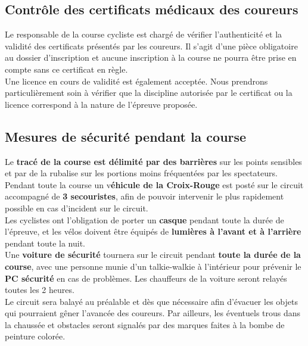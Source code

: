\documentclass[hidelinks, paper=a4, fontsize=13pt]{report}
\begin{document}
\subsection{Contrôle des certificats médicaux des coureurs}

Le responsable de la course cycliste est chargé de vérifier l’authenticité et la validité des certificats présentés par les coureurs. Il s’agit d’une pièce obligatoire au dossier d’inscription et aucune inscription à la course ne pourra être prise en compte sans ce certificat en règle.\\
Une licence en cours de validité est également acceptée.
Nous prendrons particulièrement soin à vérifier que la discipline autorisée par le certificat ou la licence correspond à la nature de l’épreuve proposée.

\subsection{Mesures de sécurité pendant la course}

Le \textbf{tracé de la course est délimité par des barrières} sur les points sensibles et par de la rubalise sur les portions moins fréquentées par les spectateurs.\\

Pendant toute la course un v\textbf{éhicule de la Croix-Rouge} est posté sur le circuit accompagné de \textbf{3 secouristes}, afin de pouvoir intervenir le plus rapidement possible en cas d’incident sur le circuit. \\

Les cyclistes ont l’obligation de porter un \textbf{casque} pendant toute la durée de l’épreuve, et les vélos doivent être équipés de \textbf{lumières à l’avant et à l’arrière} pendant toute la nuit.\\

Une \textbf{voiture de sécurité} tournera sur le circuit pendant \textbf{toute la durée de la course}, avec une personne munie d’un talkie-walkie à l’intérieur pour prévenir le \textbf{PC sécurité} en cas de problèmes. Les chauffeurs de la voiture seront relayés toutes les 2 heures.\\

Le circuit sera balayé au préalable et dès que nécessaire afin d’évacuer les objets qui pourraient gêner l’avancée des coureurs. Par ailleurs, les éventuels trous dans la chaussée et obstacles seront signalés par des marques faites à la bombe de peinture colorée.\\
\end{document}
